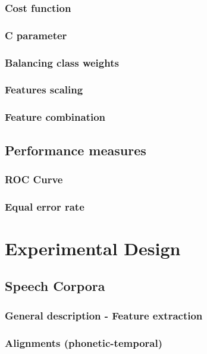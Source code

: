 \documentclass[11pt,a4paper]{tesis}
\begin{document}
		\subsection{Cost function}
			
		\subsection{C parameter}
			
		\subsection{Balancing class weights}
			
		\subsection{Features scaling}
			
		\subsection{Feature combination}
			
	\section{Performance measures}
		\subsection{ROC Curve}
			
		\subsection{Equal error rate}
			
\chapter{Experimental Design}
	\section{Speech Corpora}
		\subsection{General description - Feature extraction}
			
		\subsection{Alignments (phonetic-temporal)}
			
\end{document}
